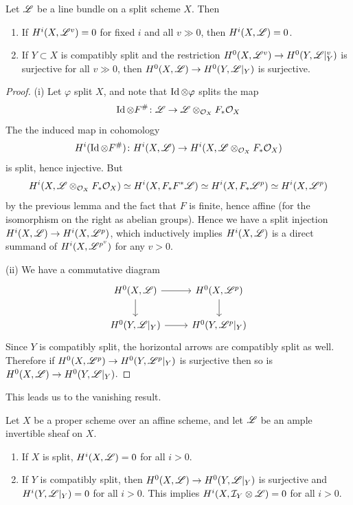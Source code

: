 \documentclass[12pt]{article}
\begin{document}
\begin{lem}\label{bklem1.2.7}
    Let $\mathscr{L}$ be a line bundle on a split scheme $X$. Then
    \begin{enumerate}[label=(\roman*)]
        \item If $H^i(X, \mathscr{L}^v) = 0$ for fixed $i$ and all $v \gg 0$, then $H^i(X, \mathscr{L}) = 0$.
        \item If $Y \subset X$ is compatibly split and the restriction $H^0(X, \mathscr{L}^v) \rightarrow H^0(Y, \mathscr{L}\vert_Y^v)$ is surjective for all $v \gg 0$, then $H^0(X, \mathscr{L}) \rightarrow H^0(Y, \mathscr{L}\vert_Y)$ is surjective.
    \end{enumerate}
\end{lem}
\begin{proof}
    (i) Let $\varphi$ split $X$, and note that $\operatorname{Id} \otimes \varphi$ splits the map
    \[\operatorname{Id} \otimes F^{\#} \colon \mathscr{L} \rightarrow \mathscr{L} \otimes_{\mathcal{O}_X} F_*\mathcal{O}_X\]
    The the induced map in cohomology
    \[H^i(\operatorname{Id} \otimes F^{\#}) \colon H^i(X, \mathscr{L}) \rightarrow H^i(X, \mathscr{L} \otimes_{\mathcal{O}_X} F_* \mathcal{O}_X)\]
    is split, hence injective. But
    \[H^i(X, \mathscr{L} \otimes_{\mathcal{O}_X} F_* \mathcal{O}_X) \simeq H^i(X, F_* F^* \mathscr{L}) \simeq H^i(X, F_* \mathscr{L}^p) \simeq H^i(X, \mathscr{L}^p)\]
    by the previous lemma and the fact that $F$ is finite, hence affine (for the isomorphism on the right as abelian groups). Hence we have a split injection $H^i(X, \mathscr{L}) \rightarrow H^i(X, \mathscr{L}^p)$, which inductively implies $H^i(X, \mathscr{L})$ is a direct summand of $H^i(X, \mathscr{L}^{p^v})$ for any $v > 0$.

    (ii) We have a commutative diagram
    \[\begin{tikzcd}
	{H^0(X, \fanl)} & {H^0(X, \fanl^p)} \\
	{H^0(Y, \fanl\vert_Y)} & {H^0(Y, \fanl^p\vert_Y)}
	\arrow[from=1-1, to=1-2]
	\arrow[from=1-1, to=2-1]
	\arrow[from=1-2, to=2-2]
	\arrow[from=2-1, to=2-2]
\end{tikzcd}\]
Since $Y$ is compatibly split, the horizontal arrows are compatibly split as well. Therefore if $H^0(X, \mathscr{L}^p) \rightarrow H^0(Y, \mathscr{L}^p\vert_Y)$ is surjective then so is $H^0(X, \mathscr{L}) \rightarrow H^0(Y, \mathscr{L}\vert_Y)$.
\end{proof}
This leads us to the vanishing result.
\begin{thm}
    Let $X$ be a proper scheme over an affine scheme, and let $\mathscr{L}$ be an ample invertible sheaf on $X$.
    \begin{enumerate}
        \item If $X$ is split, $H^i(X, \mathscr{L}) = 0$ for all $i > 0$.
        \item If $Y$ is compatibly split, then $H^0(X,\mathscr{L}) \rightarrow H^0(Y, \mathscr{L}\vert_Y)$ is surjective and $H^i(Y, \mathscr{L}\vert_Y) =0 $ for all $i > 0$. This implies $H^i(X, \mathcal{I}_Y \otimes \mathscr{L}) = 0$ for all $i > 0$.
    \end{enumerate}
\end{thm}
\end{document}
